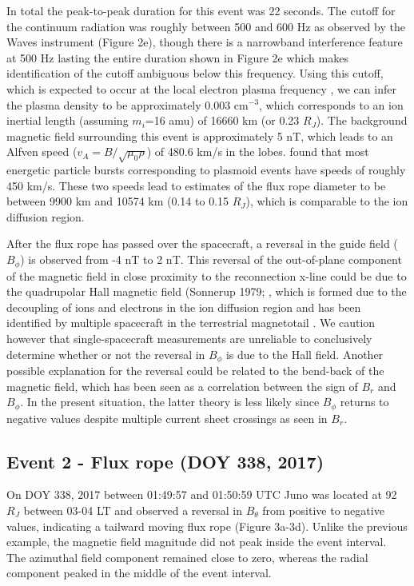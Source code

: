 In total the peak-to-peak duration for this event was 22 seconds. The cutoff for the continuum radiation was roughly between 500 and 600 Hz as observed by the Waves instrument (Figure 2e), though there is a narrowband interference feature at 500 Hz lasting the entire duration shown in Figure 2e which makes identification of the cutoff ambiguous below this frequency. Using this cutoff, which is expected to occur at the local electron plasma frequency \cite{Barnhart2009ElectronSpectra}, we can infer the plasma density to be approximately 0.003 cm$^{-3}$, which corresponds to an ion inertial length (assuming $m_i$=16 amu) of 16660 km (or  0.23 $R_J$). The background magnetic field surrounding this event is approximately 5 nT, which leads to an Alfven speed ($v_A=B/\sqrt{\mu_0 \rho}$) of 480.6 km/s in the lobes. \cite{Kronberg2008MassParameters} found that most energetic particle bursts corresponding to plasmoid events have speeds of roughly 450 km/s. These two speeds lead to estimates of the flux rope diameter to be between 9900 km and 10574 km (0.14 to 0.15 $R_J$),  which is comparable to the ion diffusion region.

After the flux rope has passed over the spacecraft, a reversal in the guide field ($B_\phi$) is observed from -4 nT to 2 nT. This reversal of the out-of-plane component of the magnetic field in close proximity to the reconnection x-line could be due to the quadrupolar Hall magnetic field (Sonnerup 1979; \cite{Eastwood2007Multi-pointOn}, which is formed due to the decoupling of ions and electrons in the ion diffusion region and has been identified by multiple spacecraft in the terrestrial magnetotail \cite{Nagai2001GeotailMagnetotail}. We caution however that single-spacecraft measurements are unreliable to conclusively determine whether or not the reversal in $B_\phi$ is due to the Hall field. Another possible explanation for the reversal could be related to the bend-back of the magnetic field, which has been seen as a correlation between the sign of $B_r$ and $B_\phi$. In the present situation, the latter theory is less likely since $B_\phi$ returns to negative values despite multiple current sheet crossings as seen in $B_r$. 

\subsection{Event 2 - Flux rope (DOY 338, 2017)}

On DOY 338, 2017 between 01:49:57 and 01:50:59 UTC Juno was located at 92 $R_J$ between 03-04 LT and observed a reversal in $B_\theta$ from positive to negative values, indicating a tailward moving flux rope (Figure 3a-3d). Unlike the previous example, the magnetic field magnitude did not peak inside the event interval. The azimuthal field component remained close to zero, whereas the radial component peaked in the middle of the event interval. 

